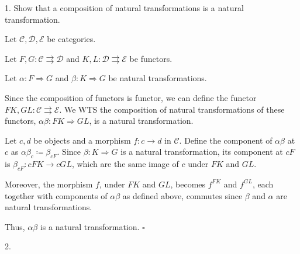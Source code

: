 \documentclass{article}
\begin{document}
1. Show that a composition of natural transformations is a natural transformation.

Let $\mathcal{C}, \mathcal{D}, \mathcal{E}$ be categories. 

Let $F,G: \mathcal{C} \rightrightarrows \mathcal{D}$ and $K,L: \mathcal{D} \rightrightarrows \mathcal{E}$ be functors.

Let $\alpha: F \Rightarrow G$ and $\beta: K \Rightarrow G$ be natural transformations.

Since the composition of functors is functor, we can define the functor $FK, GL: \mathcal{C} \rightrightarrows \mathcal{E}$. We WTS the composition of natural transformations of these functors, $\alpha\beta: FK \Rightarrow GL$, is a natural transformation. 

Let $c, d$ be objects and a morphism $f: c\to d$ in $\mathcal{C}$. Define the component of $\alpha\beta$ at $c$ as $\alpha\beta_c\coloneqq \beta_{cF}$. Since $\beta: K \Rightarrow G$ is a natural transformation, its component at $cF$ is $\beta_{cF}: cFK \to cGL$, which are the same image of $c$ under $FK$ and $GL$. 

Moreover, the morphism $f$, under $FK$ and $GL$, becomes $f^{FK}$ and $f^{GL}$, each together with components of $\alpha\beta$ as defined above, commutes since $\beta$ and $\alpha$ are natural transformations.

Thus, $\alpha\beta$ is a natural transformation. $\square$

2. 
\end{document}
